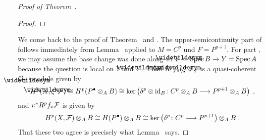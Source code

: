 \documentclass[a4paper,parskip=half,numbers=enddot, DIV=12]{scrreprt}
\begin{document}
\begin{proof}[Proof of Theorem~]
\begin{proof}
	\end{proof}
	We come back to the proof of Theorem~ and . The upper-semicontinuity part of  follows immediately from Lemma~ applied to $M=C^p$ und $F=P^{p+1}$. For part , we may assume the base change was done along $\upsilon\colon \snake{Y}=\Spec B\morphism Y=\Spec A$ because the question is local on $Y$ and $\snake{Y}$. Then $R^p\snake{f}_*(\xi^*\Ff)$ is a quasi-coherent $\Oo_{\snake{Y}}$-module given by
	\begin{align*}
		H^p(\snake{X},\xi^*\Ff)\cong H^p(P^\bullet\otimes_AB)\cong \ker\left(\delta^p\otimes\id_B\colon C^p\otimes_AB\morphism P^{p+1}\otimes_AB\right)\;,
	\end{align*}
	and $\upsilon^*R^pf_*\mathcal{F}$ is given by
	\begin{align*}
		H^p(X,\Ff)\otimes_AB\cong H(P^\bullet)\otimes_AB\cong\ker\left(\delta^p\colon C^p\morphism P^{p+1}\right)\otimes_AB\;.
	\end{align*}
	That these two agree is precisely what Lemma~ says.
	

\end{proof}
\end{document}
